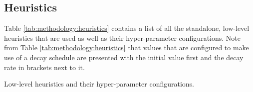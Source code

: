 \subsection{Heuristics}\label{sec:methodology:heuristics}

Table \ref{tab:methodology:heuristics} contains a list of all the standalone, low-level heuristics that are used as well as their hyper-parameter configurations. Note from Table \ref{tab:methodology:heuristics} that values that are configured to make use of a decay schedule are presented with the initial value first and the decay rate in brackets next to it.


\begin{table}[htb]
	\centering
	\caption{Low-level heuristics and their hyper-parameter configurations.}
	\label{tab:methodology:heuristics}%
	\par\bigskip
	\resizebox{0.7\textwidth}{!}{

}
\end{table}
